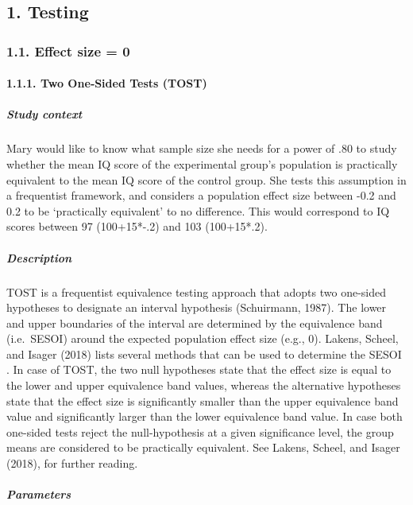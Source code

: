 \documentclass[
  english,
  man,floatsintext]{apa6}
\let\oldparagraph\paragraph
\renewcommand{\paragraph}[1]{\oldparagraph{#1}\mbox{}}
\let\oldsubparagraph\subparagraph
\renewcommand{\subparagraph}[1]{\oldsubparagraph{#1}\mbox{}}
\begin{document}
\hypertarget{testing}{%
\subsection{1. Testing}\label{testing}}

\hypertarget{effect-size-0}{%
\subsubsection{1.1. Effect size = 0}\label{effect-size-0}}

\hypertarget{two-onesided-tests-tost}{%
\paragraph{1.1.1. Two One‐Sided Tests (TOST)}\label{two-onesided-tests-tost}}

\hypertarget{study-context}{%
\subparagraph{Study context}\label{study-context}}

Mary would like to know what sample size she needs for a power of .80 to study whether the mean IQ score of the experimental group's population is practically equivalent to the mean IQ score of the control group. She tests this assumption in a frequentist framework, and considers a population effect size between -0.2 and 0.2 to be `practically equivalent' to no difference. This would correspond to IQ scores between 97 (100+15*-.2) and 103 (100+15*.2).

\hypertarget{description}{%
\subparagraph{Description}\label{description}}

TOST is a frequentist equivalence testing approach that adopts two one-sided hypotheses to designate an interval hypothesis (Schuirmann, 1987). The lower and upper boundaries of the interval are determined by the equivalence band (i.e.~SESOI) around the expected population effect size (e.g., 0). Lakens, Scheel, and Isager (2018) lists several methods that can be used to determine the SESOI . In case of TOST, the two null hypotheses state that the effect size is equal to the lower and upper equivalence band values, whereas the alternative hypotheses state that the effect size is significantly smaller than the upper equivalence band value and significantly larger than the lower equivalence band value. In case both one-sided tests reject the null-hypothesis at a given significance level, the group means are considered to be practically equivalent. See Lakens, Scheel, and Isager (2018), for further reading.

\hypertarget{parameters}{%
\subparagraph{Parameters}\label{parameters}}
\end{document}
